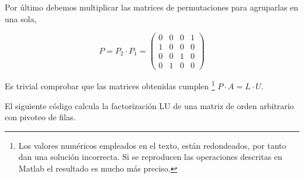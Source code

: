 Por último debemos multiplicar las matrices de permutaciones para agruparlas en una sola,

\begin{equation*}
P=P_2\cdot P_1= \begin{pmatrix}
0& 0& 0& 1\\
1& 0& 0& 0\\
0& 0& 1& 0\\
0& 1& 0& 0
\end{pmatrix}
\end{equation*}

Es trivial comprobar que las matrices obtenidas cumplen \footnote{Los valores numéricos empleados en el texto, están redondeados, por tanto dan una solución incorrecta. Si se reproducen las operaciones descritas en Matlab el resultado es mucho más preciso.} $P\cdot A = L\cdot U$.

El siguiente código calcula la factorización LU de una matriz de orden arbitrario con pivoteo de filas. \label{lufact} 

